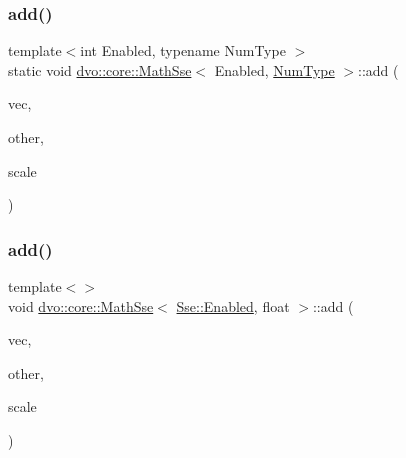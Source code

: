 \subsubsection{\texorpdfstring{add()}{add()}\hspace{0.1cm}{\footnotesize\ttfamily [1/5]}}
{\footnotesize\ttfamily template$<$int Enabled, typename Num\+Type $>$ \\
static void \mbox{\hyperlink{classdvo_1_1core_1_1_math_sse}{dvo\+::core\+::\+Math\+Sse}}$<$ Enabled, \mbox{\hyperlink{namespacedvo_1_1core_ab9c199d221775a923e2549ad7e15c323}{Num\+Type}} $>$\+::add (\begin{DoxyParamCaption}\item[{Eigen\+::\+Matrix$<$ \mbox{\hyperlink{namespacedvo_1_1core_ab9c199d221775a923e2549ad7e15c323}{Num\+Type}}, 6, 1 $>$ \&}]{vec,  }\item[{const Eigen\+::\+Matrix$<$ \mbox{\hyperlink{namespacedvo_1_1core_ab9c199d221775a923e2549ad7e15c323}{Num\+Type}}, 6, 1 $>$ \&}]{other,  }\item[{const \mbox{\hyperlink{namespacedvo_1_1core_ab9c199d221775a923e2549ad7e15c323}{Num\+Type}} \&}]{scale }\end{DoxyParamCaption})\hspace{0.3cm}{\ttfamily [static]}}

\mbox{\label{classdvo_1_1core_1_1_math_sse_a942e37dc174d6ed03a48fcb9e9b53b88}} 
\subsubsection{\texorpdfstring{add()}{add()}\hspace{0.1cm}{\footnotesize\ttfamily [2/5]}}
{\footnotesize\ttfamily template$<$$>$ \\
void \mbox{\hyperlink{classdvo_1_1core_1_1_math_sse}{dvo\+::core\+::\+Math\+Sse}}$<$ \mbox{\hyperlink{structdvo_1_1core_1_1_sse_a4fd9b55a1ec035f837cc78f33d45a9adadefbacd4d80d2e8ba64c1583a4fda95a}{Sse\+::\+Enabled}}, float $>$\+::add (\begin{DoxyParamCaption}\item[{Eigen\+::\+Matrix$<$ float, 6, 1 $>$ \&}]{vec,  }\item[{const Eigen\+::\+Matrix$<$ float, 6, 1 $>$ \&}]{other,  }\item[{const float \&}]{scale }\end{DoxyParamCaption})}

